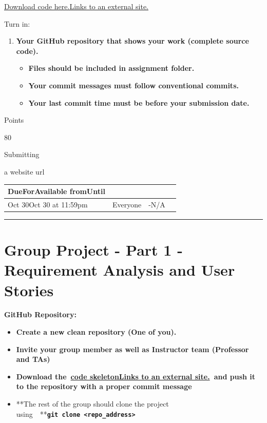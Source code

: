\documentclass[
]{article}
\providecommand{\tightlist}{%
  \setlength{\itemsep}{0pt}\setlength{\parskip}{0pt}}
\begin{document}
\href{https://github.com/samfallahian/ITSC3155-Assignments}{Download
code here.Links to an external site.}

Turn in:

\begin{enumerate}
\def\labelenumi{\arabic{enumi}.}
\tightlist
\item
  \textbf{Your GitHub repository that shows your work (complete source
  code).}

  \begin{itemize}
  \tightlist
  \item
    \textbf{Files should be included in assignment folder.}
  \item
    \textbf{Your commit messages must follow conventional commits.}
  \item
    \textbf{Your last commit time must be before your submission date.}
  \end{itemize}
\end{enumerate}

Points

80

Submitting

a website url

\begin{longtable}[]{@{}llll@{}}
\toprule\noalign{}
DueForAvailable fromUntil & & & \\
\midrule\noalign{}
\endhead
\bottomrule\noalign{}
\endlastfoot
Oct 30Oct 30 at 11:59pm & Everyone & -N/A & \\
\end{longtable}

\begin{center}\rule{0.5\linewidth}{0.5pt}\end{center}

\section{Group Project - Part 1 - Requirement Analysis and User
Stories}\label{group-project---part-1---requirement-analysis-and-user-stories}

\textbf{GitHub Repository:}

\begin{itemize}
\tightlist
\item
  \textbf{Create a new clean repository (One of you).}
\item
  \textbf{Invite your group member as well as Instructor team (Professor
  and TAs)}
\item
  \textbf{Download
  the~\textbf{\href{https://github.com/samfallahian/ITSC3155-Assignments/tree/main/FinalProject}{\textbf{code
  skeletonLinks to an external site.}}}~and push it to the repository
  with a proper commit message}
\item
  **The rest of the group should clone the project
  using~~**\textbf{\texttt{git\ clone\ \textless{}repo\_address\textgreater{}}}
\end{itemize}
\end{document}
